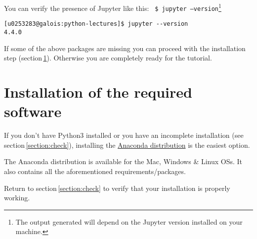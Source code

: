 \documentclass[11pt]{article}
\begin{document}
You can verify the presence of Jupyter like this:\newline\newline
\texttt{
\$ jupyter --version}\footnote{The output generated will depend on the Jupyter version installed on your machine.}
\begin{verbatim}
[u0253283@galois:python-lectures]$ jupyter --version
4.4.0
\end{verbatim}

If some of the above packages are missing you can proceed with 
the installation step (section\,\ref{section:install}). Otherwise 
you are completely ready for the tutorial.
 
\section{Installation of the required software}\label{section:install}
If you don't have Python$3$ installed or you have an incomplete installation 
(see section\,\ref{section:check}),
installing the \href{https://www.anaconda.com/download/}{Anaconda distribution} is 
the easiest option.

The Anaconda distribution is available for the Mac, Windows \& Linux OSs. 
It also contains all the aforementioned requirements/packages.

Return to section\,\ref{section:check} to verify that your installation is properly working.


%
\end{document}
